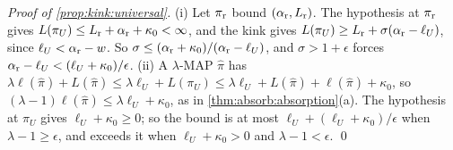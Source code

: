 \emph{Proof of \cref{prop:kink:universal}.} (i) Let $\pi_{\rm r}$ bound $(\alpha_{\rm r},L_{\rm r})$. The hypothesis at $\pi_{\rm r}$ gives $L(\pi_U)\le L_{\rm r}+\alpha_{\rm r}+\kappa_0<\infty$, and the kink gives $L(\pi_U)\ge L_{\rm r}+\sigma(\alpha_{\rm r}-\ell_U)$, since $\ell_U<\alpha_{\rm r}-w$. So $\sigma\le(\alpha_{\rm r}+\kappa_0)/(\alpha_{\rm r}-\ell_U)$, and $\sigma>1+\epsilon$ forces $\alpha_{\rm r}-\ell_U<(\ell_U+\kappa_0)/\epsilon$. (ii) A $\lambda$-MAP $\hat\pi$ has $\lambda\ell(\hat\pi)+L(\hat\pi)\le\lambda\ell_U+L(\pi_U)\le\lambda\ell_U+L(\hat\pi)+\ell(\hat\pi)+\kappa_0$, so $(\lambda-1)\ell(\hat\pi)\le\lambda\ell_U+\kappa_0$, as in \cref{thm:absorb:absorption}(a). The hypothesis at $\pi_U$ gives $\ell_U+\kappa_0\ge0$; so the bound is at most $\ell_U+(\ell_U+\kappa_0)/\epsilon$ when $\lambda-1\ge\epsilon$, and exceeds it when $\ell_U+\kappa_0>0$ and $\lambda-1<\epsilon$. \qed
